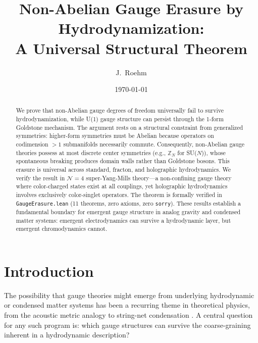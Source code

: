 \documentclass[aps,prl,twocolumn,superscriptaddress,showpacs]{revtex4-2}
\begin{document}
\title{Non-Abelian Gauge Erasure by Hydrodynamization: \\
A Universal Structural Theorem}

\author{J.~Roehm}

\date{\today}

\begin{abstract}
We prove that non-Abelian gauge degrees of freedom universally fail to
survive hydrodynamization, while U(1) gauge structure can persist through
the 1-form Goldstone mechanism. The argument rests on a structural
constraint from generalized symmetries: higher-form symmetries must be
Abelian because operators on codimension $>1$ submanifolds necessarily
commute. Consequently, non-Abelian gauge theories possess at most discrete
center symmetries (e.g., $\mathbb{Z}_N$ for SU($N$)), whose spontaneous
breaking produces domain walls rather than Goldstone bosons. This erasure
is universal across standard, fracton, and holographic hydrodynamics. We
verify the result in $\mathcal{N}=4$ super-Yang-Mills theory---a non-confining
gauge theory where color-charged states exist at all couplings, yet
holographic hydrodynamics involves exclusively color-singlet operators. The
theorem is formally verified in \texttt{GaugeErasure.lean}
(11 theorems, zero axioms, zero \texttt{sorry}). These results establish a
fundamental boundary for emergent gauge structure in analog gravity and
condensed matter systems: emergent electrodynamics can survive a
hydrodynamic layer, but emergent chromodynamics cannot.
\end{abstract}

\maketitle

\section{Introduction}

The possibility that gauge theories might emerge from underlying
hydrodynamic or condensed matter systems has been a recurring theme
in theoretical physics, from the acoustic metric analogy
\cite{Unruh1981,Visser1998} to string-net condensation
\cite{Wen2003,LevinWen2006}. A central question for any such program
is: which gauge structures can survive the coarse-graining inherent in
a hydrodynamic description?
\end{document}
